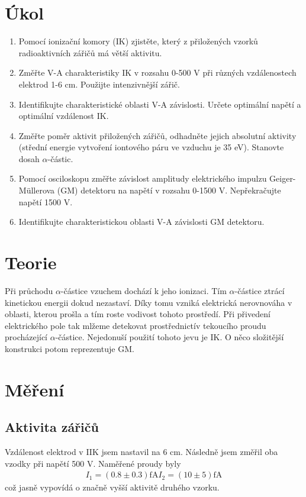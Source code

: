 \documentclass[a4paper,12pt]{article}
\begin{document}
\section{Úkol}
\begin{enumerate}
\item Pomocí ionizační komory (IK) zjistěte, který z přiložených vzorků radioaktivních zářičů má větší aktivitu.
\item Změřte V-A charakteristiky IK v rozsahu 0-500 V při různých vzdálenostech elektrod 1-6 cm. Použijte intenzivnější zářič.
\item Identifikujte charakteristické oblasti V-A závislosti. Určete optimální napětí a optimální vzdálenost IK.
\item Změřte poměr aktivit přiložených zářičů, odhadněte jejich absolutní aktivity (střední energie vytvoření iontového páru ve vzduchu je 35 eV). 
Stanovte dosah $\alpha$-částic.
\item Pomocí osciloskopu změřte závislost amplitudy elektrického impulzu Geiger-Müllerova (GM) detektoru na napětí v rozsahu 0-1500 V. 
Nepřekračujte napětí 1500 V.
\item Identifikujte charakteristickou oblasti V-A závislosti GM detektoru.
\end{enumerate}

\section{Teorie}
Při průchodu $\alpha$-částice vzuchem dochází k jeho ionizaci. Tím $\alpha$-částice ztrácí kinetickou energii dokud nezastaví. Díky tomu vzniká elektrická 
nerovnováha v oblasti, kterou prošla a tím roste vodivost tohoto prostředí. 
Při přivedení elektrického pole tak mlžeme detekovat prostřednictív tekoucího proudu procházející $\alpha$-částice. Nejedonuší použití tohoto jevu je IK. O něco složitější konstrukci potom reprezentuje GM.

\section{Měření}
\subsection{Aktivita zářičů}
Vzdálenost elektrod v IIK jsem nastavil na 6 cm. Následně jsem změřil oba vzodky při napětí 500 V. Naměřené proudy byly
\begin{eqnarray}
I_1=(0.8\pm 0.3) \mbox{fA}
I_2=(10 \pm 5) \mbox{fA}
\end{eqnarray}
což jasně vypovídá o značně vyšší aktivitě druhého vzorku.
\end{document}
